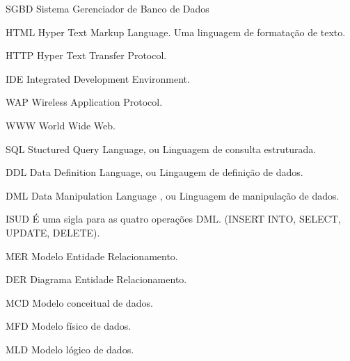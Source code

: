 \begin{siglas}
	\item[SGBD] Sistema Gerenciador de Banco de Dados
	\item[HTML] Hyper Text Markup Language. Uma linguagem de formatação de texto.
	\item[HTTP] Hyper Text Transfer Protocol.
	\item[IDE]	Integrated Development Environment.
	\item[WAP]	Wireless Application Protocol.
	\item[WWW]	World Wide Web.
	\item[SQL]	Stuctured Query Language, ou Linguagem de consulta estruturada.
	\item[DDL]	Data Definition Language, ou Lingaugem de definição de dados.
	\item[DML]	Data Manipulation Language , ou Linguagem de manipulação de dados.
	\item[ISUD]	É uma sigla para as quatro operações DML. (INSERT INTO, SELECT, UPDATE, DELETE).
	\item[MER]	Modelo Entidade Relacionamento. 
	\item[DER]	Diagrama Entidade Relacionamento.
	\item[MCD]	Modelo conceitual de dados. 
	\item[MFD]	Modelo físico de dados. 
	\item[MLD]	Modelo lógico de dados. 

	
\end{siglas}